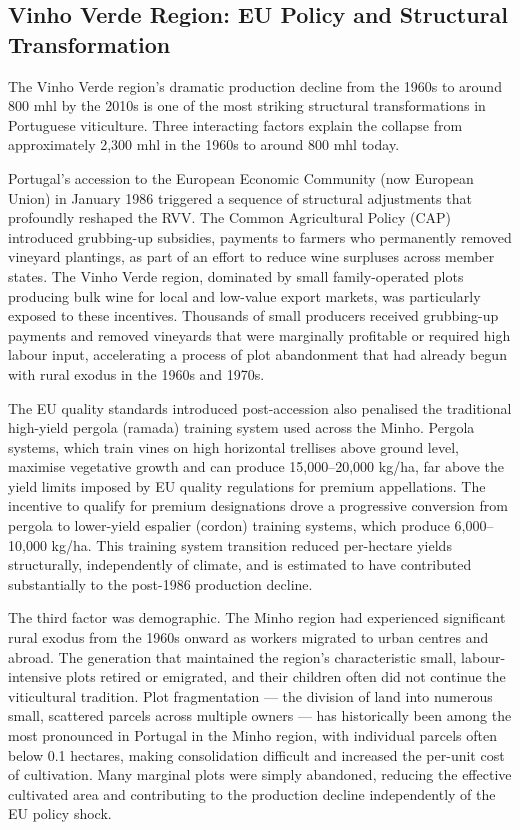 \subsection{Vinho Verde Region: EU Policy and Structural Transformation}\label{sub:vinho_verde_region_eu}

The Vinho Verde region's dramatic production decline from the 1960s to around 800 mhl by the 2010s is one of the most striking structural transformations in Portuguese viticulture. Three interacting factors explain the collapse from approximately 2,300 mhl in the 1960s to around 800 mhl today.

Portugal's accession to the European Economic Community (now European Union) in January 1986 triggered a sequence of structural adjustments that profoundly reshaped the RVV. The Common Agricultural Policy (CAP) introduced grubbing-up subsidies, payments to farmers who permanently removed vineyard plantings, as part of an effort to reduce wine surpluses across member states. The Vinho Verde region, dominated by small family-operated plots producing bulk wine for local and low-value export markets, was particularly exposed to these incentives. Thousands of small producers received grubbing-up payments and removed vineyards that were marginally profitable or required high labour input, accelerating a process of plot abandonment that had already begun with rural exodus in the 1960s and 1970s.

The EU quality standards introduced post-accession also penalised the traditional high-yield pergola (ramada) training system used across the Minho. Pergola systems, which train vines on high horizontal trellises above ground level, maximise vegetative growth and can produce 15,000--20,000 kg/ha, far above the yield limits imposed by EU quality regulations for premium appellations. The incentive to qualify for premium designations drove a progressive conversion from pergola to lower-yield espalier (cordon) training systems, which produce 6,000--10,000 kg/ha. This training system transition reduced per-hectare yields structurally, independently of climate, and is estimated to have contributed substantially to the post-1986 production decline.

The third factor was demographic. The Minho region had experienced significant rural exodus from the 1960s onward as workers migrated to urban centres and abroad. The generation that maintained the region's characteristic small, labour-intensive plots retired or emigrated, and their children often did not continue the viticultural tradition. Plot fragmentation --- the division of land into numerous small, scattered parcels across multiple owners --- has historically been among the most pronounced in Portugal in the Minho region, with individual parcels often below 0.1 hectares, making consolidation difficult and increased the per-unit cost of cultivation. Many marginal plots were simply abandoned, reducing the effective cultivated area and contributing to the production decline independently of the EU policy shock.

